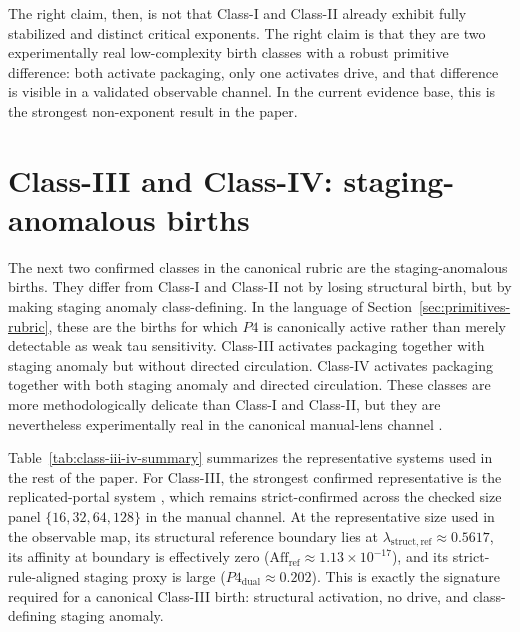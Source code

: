 \documentclass[11pt]{article}
\begin{document}
The right claim, then, is not that Class-I and Class-II already exhibit fully stabilized and distinct critical exponents. The right claim is that they are two experimentally real low-complexity birth classes with a robust primitive difference: both activate packaging, only one activates drive, and that difference is visible in a validated observable channel. In the current evidence base, this is the strongest non-exponent result in the paper.
 \section{Class-III and Class-IV: staging-anomalous births}
\label{sec:class-iii-iv}

The next two confirmed classes in the canonical rubric are the staging-anomalous births. They differ from Class-I and Class-II not by losing structural birth, but by making staging anomaly class-defining. In the language of Section~\ref{sec:primitives-rubric}, these are the births for which $P4$ is canonically active rather than merely detectable as weak tau sensitivity. Class-III activates packaging together with staging anomaly but without directed circulation. Class-IV activates packaging together with both staging anomaly and directed circulation. These classes are more methodologically delicate than Class-I and Class-II, but they are nevertheless experimentally real in the canonical manual-lens channel \cite{sixbirds_foundations}.

Table~\ref{tab:class-iii-iv-summary} summarizes the representative systems used in the rest of the paper. For Class-III, the strongest confirmed representative is the replicated-portal system , which remains strict-confirmed across the checked size panel $\{16,32,64,128\}$ in the manual channel. At the representative size used in the observable map, its structural reference boundary lies at $\lambda_{\mathrm{struct,ref}}\approx 0.5617$, its affinity at boundary is effectively zero ($\mathrm{Aff}_{\mathrm{ref}}\approx 1.13\times 10^{-17}$), and its strict-rule-aligned staging proxy is large ($P4_{\mathrm{dual}}\approx 0.202$). This is exactly the signature required for a canonical Class-III birth: structural activation, no drive, and class-defining staging anomaly.
\end{document}
